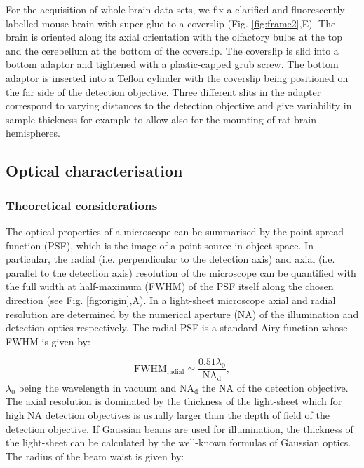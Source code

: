 \documentclass[12pt]{spieman}  %
\begin{document}
For the acquisition of whole brain data sets, we fix a clarified and fluorescently-labelled mouse brain with super glue to a coverslip (Fig. \ref{fig:frame2},E). The brain is oriented along its axial orientation with the olfactory bulbs at the top and the cerebellum at the bottom of the coverslip. The coverslip is slid into a bottom adaptor and tightened with a plastic-capped grub screw. The bottom adaptor is inserted into a Teflon cylinder with the coverslip being positioned on the far side of the detection objective. Three different slits in the adapter correspond to varying distances to the detection objective and give variability in sample thickness for example to allow also for the mounting of rat brain hemispheres.
	
\subsection{Optical characterisation}

\subsubsection{Theoretical considerations}

The optical properties of a microscope can be summarised by the point-spread function (PSF), which is the image of a point source in object space. In particular, the radial (i.e. perpendicular to the detection axis) and axial (i.e. parallel to the detection axis) resolution of the microscope can be quantified with the full width at half-maximum (FWHM) of the PSF itself along the chosen direction (see Fig. \ref{fig:origin},A). In a light-sheet microscope axial and radial resolution are determined by the numerical aperture (NA) of the illumination and detection optics respectively. The radial PSF is a standard Airy function whose FWHM is given by:

\begin{equation}
\text{FWHM}_{\text{radial}} \simeq \frac{0.51 \lambda_0}{\text{NA}_{\text{d}}},
\end{equation}
$\lambda_0$ being the wavelength in vacuum and $\text{NA}_{\text{d}}$ the NA of the detection objective. The axial resolution is dominated by the thickness of the light-sheet which for high NA detection objectives is usually larger than the depth of field of the detection objective. If Gaussian beams are used for illumination, the thickness of the light-sheet can be calculated by the well-known formulas of Gaussian optics\cite{Teich}. The radius of the beam waist is given by:
\end{document}
